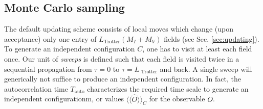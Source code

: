 %
\subsection{Monte Carlo sampling}\label{sec:sampling}
%
The default updating scheme consists of local moves which change (upon acceptance) only one  entry of $L_{\mathrm{Trotter}}(M_I+M_V)$  fields (see Sec. \ref{sec:updating}). 
To generate  an independent configuration $C$,   one has to visit at least each field  once.  Our unit of \textit{sweeps} is defined such that each field is visited twice in a sequential propagation from $\tau = 0$ to $\tau = L_{\text{ Trotter}}$  and back.  A single sweep will  generically not  suffice to produce an independent  configuration.
In fact, the autocorrelation time $T_\mathrm{auto}$ characterizes the required time scale to generate an independent configurationm, or values $\langle\langle\hat{O}\rangle\rangle_C$ for the observable $O$.

